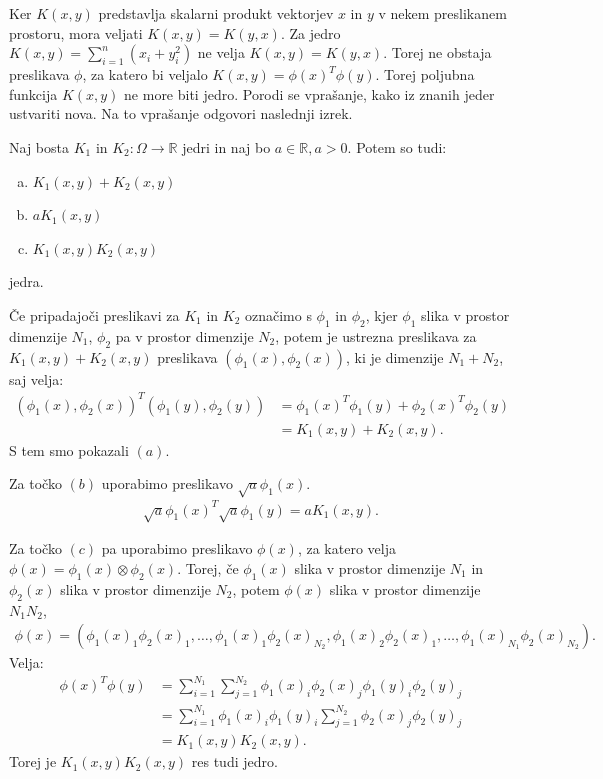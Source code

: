 \documentclass[mat1]{fmfdelo}
\newcommand{\R}{\mathbb R}
\begin{document}
\begin{primer}
    Ker $K(x, y)$ predstavlja skalarni produkt vektorjev $x$ in $y$ v nekem preslikanem prostoru, mora veljati $K(x, y) = K(y, x)$. Za jedro $K(x, y) = \sum_{i=1}^{n}(x_i + y_i^2)$  ne velja $K(x, y) = K(y, x)$. Torej ne obstaja preslikava $\phi$, za katero bi veljalo  $K(x, y) = \phi(x)^T\phi(y)$. Torej poljubna funkcija $K(x, y)$ ne more biti jedro. Porodi se vprašanje, kako iz znanih jeder ustvariti nova. Na to vprašanje odgovori naslednji izrek. 
\end{primer}

\begin{izrek}
	\label{izrekKonstrukcijaJeder}
	Naj bosta $K_1$ in $K_2 : \Omega \to \R$ jedri in naj bo $a \in \R, a > 0$. Potem so tudi:
	\begin{enumerate}[(a)]
		\item
		$K_1(x, y) + K_2(x, y)$
		\item 
		$aK_1(x, y)$
		\item 
		$K_1(x, y)K_2(x, y)$
	\end{enumerate}
	jedra. 
\end{izrek}

\begin{dokaz}
	Če pripadajoči preslikavi za $K_1$ in $K_2$ označimo s $\phi_1$ in $\phi_2$, kjer $\phi_1$ slika v prostor dimenzije $N_1$, $\phi_2$ pa v prostor dimenzije $N_2$,  potem je ustrezna preslikava za $K_1(x, y) + K_2(x, y)$ preslikava $(\phi_1(x), \phi_2(x))$, ki je dimenzije $N_1 + N_2$, saj velja: 
	\begin{align*}
	(\phi_1(x), \phi_2(x))^T(\phi_1(y), \phi_2(y)) &= \phi_1(x)^T\phi_1(y) + \phi_2(x)^T\phi_2(y)  \\
	&=K_1(x, y) + K_2(x, y).
	\end{align*}
	S tem smo pokazali $(a)$. 
	
	Za točko $(b)$ uporabimo preslikavo $\sqrt{a}\phi_1(x)$.
	\begin{align*}
	\sqrt{a}\phi_1(x)^T\sqrt{a}\phi_1(y) = aK_1(x, y).
	\end{align*}
	
	Za točko $(c)$ pa uporabimo preslikavo $\phi(x)$, za katero velja $\phi(x)= \phi_1(x)\otimes\phi_2(x)$. Torej, če $\phi_1(x)$ slika v prostor dimenzije $N_1$ in  $\phi_2(x)$ slika v prostor dimenzije $N_2$, potem $\phi(x)$ slika v prostor dimenzije $N_1N_2$, 
	\begin{align*}
	\phi(x) = (\phi_1(x)_1\phi_2(x)_1,\ldots, \phi_1(x)_1\phi_2(x)_{N_2}, \phi_1(x)_2\phi_2(x)_1,\ldots, \phi_1(x)_{N_1}\phi_2(x)_{N_2}).
	\end{align*}
	Velja:
	\begin{align*}
	\phi(x)^T\phi(y) &= \sum_{i=1}^{N_1}\sum_{j=1}^{N_2}\phi_1(x)_i\phi_2(x)_j\phi_1(y)_i\phi_2(y)_j \\
	&= \sum_{i=1}^{N_1}\phi_1(x)_i\phi_1(y)_i \sum_{j=1}^{N_2}\phi_2(x)_j\phi_2(y)_j\\
	&= K_1(x, y)K_2(x, y).
	\end{align*}
	Torej je $K_1(x, y)K_2(x, y)$ res tudi jedro. 
\end{dokaz}
\end{document}
